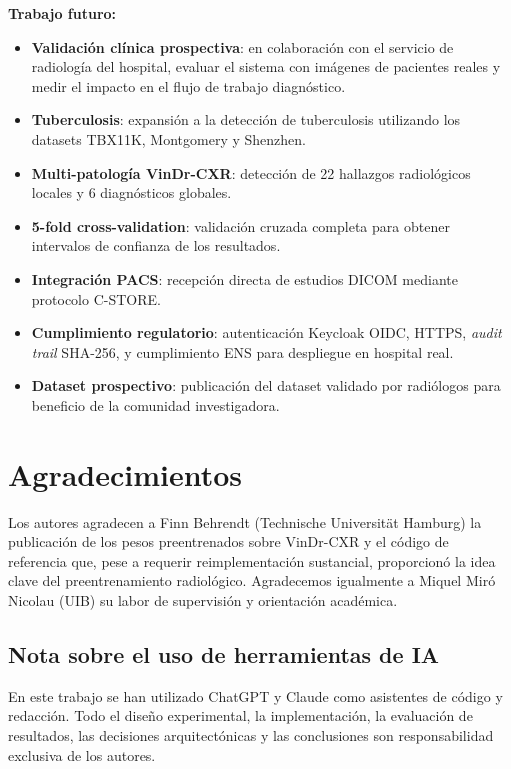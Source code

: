 \documentclass[conference]{IEEEtran}
\begin{document}
\textbf{Trabajo futuro:}
\begin{itemize}
\item \textbf{Validaci\'{o}n cl\'{i}nica prospectiva}: en colaboraci\'{o}n con
el servicio de radiolog\'{i}a del hospital, evaluar el sistema con im\'{a}genes
de pacientes reales y medir el impacto en el flujo de trabajo diagn\'{o}stico.
\item \textbf{Tuberculosis}: expansi\'{o}n a la detecci\'{o}n de tuberculosis
utilizando los datasets TBX11K, Montgomery y Shenzhen.
\item \textbf{Multi-patolog\'{i}a VinDr-CXR}: detecci\'{o}n de 22 hallazgos
radiol\'{o}gicos locales y 6 diagn\'{o}sticos globales.
\item \textbf{5-fold cross-validation}: validaci\'{o}n cruzada completa para
obtener intervalos de confianza de los resultados.
\item \textbf{Integraci\'{o}n PACS}: recepci\'{o}n directa de estudios DICOM
mediante protocolo C-STORE.
\item \textbf{Cumplimiento regulatorio}: autenticaci\'{o}n Keycloak OIDC,
HTTPS, \textit{audit trail} SHA-256, y cumplimiento ENS para despliegue en
hospital real.
\item \textbf{Dataset prospectivo}: publicaci\'{o}n del dataset validado por
radi\'{o}logos para beneficio de la comunidad investigadora.
\end{itemize}


\section*{Agradecimientos}

Los autores agradecen a Finn Behrendt (Technische Universit\"{a}t Hamburg) la
publicaci\'{o}n de los pesos preentrenados sobre VinDr-CXR y el c\'{o}digo de
referencia que, pese a requerir reimplementaci\'{o}n sustancial, proporcion\'{o}
la idea clave del preentrenamiento radiol\'{o}gico. Agradecemos igualmente a
Miquel Mir\'{o} Nicolau (UIB) su labor de supervisi\'{o}n y orientaci\'{o}n
acad\'{e}mica.

\subsection*{Nota sobre el uso de herramientas de IA}

En este trabajo se han utilizado ChatGPT y Claude como asistentes de
c\'{o}digo y redacci\'{o}n. Todo el dise\~{n}o experimental, la
implementaci\'{o}n, la evaluaci\'{o}n de resultados, las decisiones
arquitect\'{o}nicas y las conclusiones son responsabilidad exclusiva de los
autores.
\end{document}
